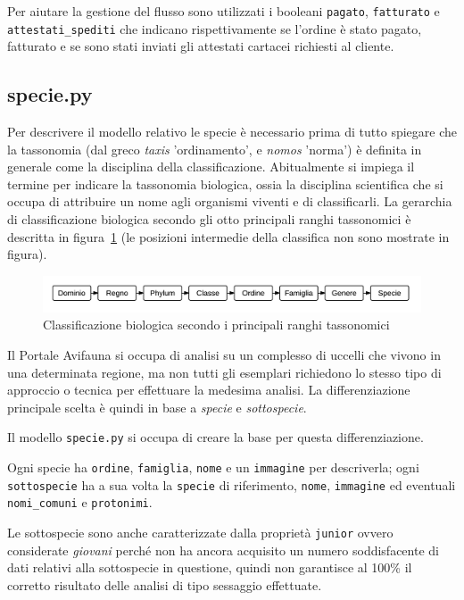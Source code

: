 Per aiutare la gestione del flusso sono utilizzati i booleani \texttt{pagato}, \texttt{fatturato} e \texttt{attestati\_spediti} che indicano rispettivamente se l'ordine è stato pagato, fatturato e se sono stati inviati gli attestati cartacei richiesti al cliente.

\subsection*{specie.py}
\label{subs:specie}

Per descrivere il modello relativo le specie è necessario prima di tutto spiegare che la tassonomia (dal greco \emph{taxis} 'ordinamento', e \emph{nomos} 'norma') è definita in generale come la disciplina della classificazione. Abitualmente si impiega il termine per indicare la tassonomia biologica, ossia la disciplina scientifica che si occupa di attribuire un nome agli organismi viventi e di classificarli. La gerarchia di classificazione biologica secondo gli otto principali ranghi tassonomici è descritta in figura~\ref{fig:tassonomia} (le posizioni intermedie della classifica non sono mostrate in figura).

\begin{figure}
 \includegraphics[width=1\textwidth]{images/tassonomia} 
 \caption{Classificazione biologica secondo i principali ranghi tassonomici}
 \label{fig:tassonomia}
\end{figure}

Il Portale Avifauna si occupa di analisi su un complesso di uccelli che vivono in una determinata regione, ma non tutti gli esemplari richiedono lo stesso tipo di approccio o tecnica per effettuare la medesima analisi. La differenziazione principale scelta è quindi in base a \emph{specie} e \emph{sottospecie}.

Il modello \texttt{specie.py} si occupa di creare la base per questa differenziazione. 

Ogni specie ha \texttt{ordine}, \texttt{famiglia}, \texttt{nome} e un \texttt{immagine} per descriverla; ogni \texttt{sottospecie} ha a sua volta la \texttt{specie} di riferimento, \texttt{nome}, \texttt{immagine} ed eventuali \texttt{nomi\_comuni} e \texttt{protonimi}. 

Le sottospecie sono anche caratterizzate dalla proprietà \texttt{junior} ovvero considerate \emph{giovani} perché {\fem} non ha ancora acquisito un numero soddisfacente di dati relativi alla sottospecie in questione, quindi non garantisce al 100\% il corretto risultato delle analisi di tipo sessaggio effettuate. 

